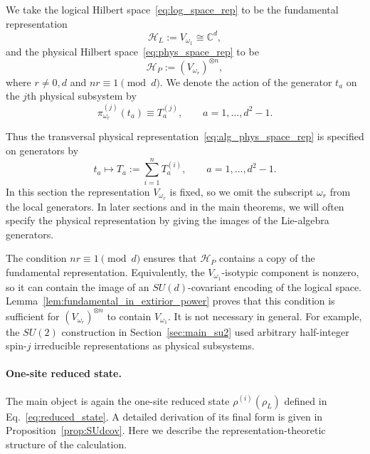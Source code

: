 \documentclass[10pt,twocolumn,superscriptaddress,aps,amsmath,amssymb,citeautoscript,floatfix,prx]{revtex4-2}
\newcounter{alg}
\theoremstyle{plain}
\theoremstyle{plain}
\theoremstyle{plain}
\theoremstyle{plain}
\theoremstyle{plain}
\theoremstyle{plain}
\theoremstyle{plain}
\theoremstyle{definition}
\theoremstyle{plain}
\begin{document}
We take the logical Hilbert space~\eqref{eq:log_space_rep} to be the fundamental representation
$$
\mathcal H_L:=V_{\omega_1}\cong \mathbb C^d ,
$$
and the physical Hilbert space~\eqref{eq:phys_space_rep} to be
$$
\mathcal H_P:=(V_{\omega_r})^{\otimes n},
$$
where $r\neq 0,d$ and $nr\equiv 1\pmod d$. We denote the action of the generator $t_a$ on the $j$th physical subsystem by
\begin{equation}\label{eq:su_d_gens}
    \pi_{\omega_r}^{(j)}(t_a)\equiv T_a^{(j)},
    \qquad
    a=1,\ldots,d^2-1 .
\end{equation}

Thus the transversal physical representation~\eqref{eq:alg_phys_space_rep} is specified on generators by
$$
t_a
\longmapsto
T_a
:=
\sum_{i=1}^n T_a^{(i)},
\qquad
a=1,\ldots,d^2-1 .
$$
In this section the representation $V_{\omega_r}$ is fixed, so we omit the subscript $\omega_r$ from the local generators. 
In later sections and in the main theorems, we will often specify the physical representation by giving the images of the Lie-algebra generators.

The condition $nr\equiv 1\pmod d$ ensures that $\mathcal H_P$ contains a copy of the fundamental representation. 
Equivalently, the $V_{\omega_1}$-isotypic component is nonzero, so it can contain the image of an $SU(d)$-covariant encoding of the logical space. 
Lemma~\ref{lem:fundamental_in_extirior_power} proves that this condition is sufficient for $(V_{\omega_r})^{\otimes n}$ to contain $V_{\omega_1}$. 
It is not necessary in general. For example, the $SU(2)$ construction in Section~\ref{sec:main_su2} used arbitrary half-integer spin-$j$ irreducible representations 
as physical subsystems.

\paragraph{One-site reduced state.}

The main object is again the one-site reduced state $\rho^{(i)}(\rho_L)$ defined in Eq.~\eqref{eq:reduced_state}. 
A detailed derivation of its final form is given in Proposition~\ref{prop:SUdcov}. Here we describe the representation-theoretic structure of the calculation.
\end{document}

